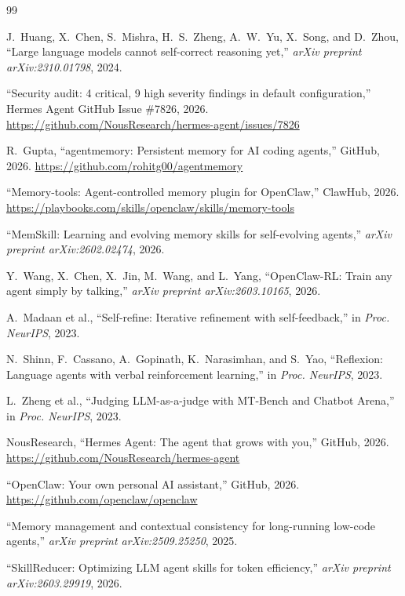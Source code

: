 \documentclass[12pt,a4paper]{article}
\begin{document}
	
	\begin{thebibliography}{99}
		
		J.~Huang, X.~Chen, S.~Mishra, H.~S.~Zheng, A.~W.~Yu, X.~Song, and D.~Zhou,
		``Large language models cannot self-correct reasoning yet,''
		\textit{arXiv preprint arXiv:2310.01798}, 2024.
		
		``Security audit: 4 critical, 9 high severity findings in default configuration,''
		Hermes Agent GitHub Issue \#7826, 2026.
		\url{https://github.com/NousResearch/hermes-agent/issues/7826}
		
		R.~Gupta,
		``agentmemory: Persistent memory for AI coding agents,''
		GitHub, 2026.
		\url{https://github.com/rohitg00/agentmemory}
		
		``Memory-tools: Agent-controlled memory plugin for OpenClaw,''
		ClawHub, 2026.
		\url{https://playbooks.com/skills/openclaw/skills/memory-tools}
		
		``MemSkill: Learning and evolving memory skills for self-evolving agents,''
		\textit{arXiv preprint arXiv:2602.02474}, 2026.
		
		Y.~Wang, X.~Chen, X.~Jin, M.~Wang, and L.~Yang,
		``OpenClaw-RL: Train any agent simply by talking,''
		\textit{arXiv preprint arXiv:2603.10165}, 2026.
		
		A.~Madaan et al.,
		``Self-refine: Iterative refinement with self-feedback,''
		in \textit{Proc. NeurIPS}, 2023.
		
		N.~Shinn, F.~Cassano, A.~Gopinath, K.~Narasimhan, and S.~Yao,
		``Reflexion: Language agents with verbal reinforcement learning,''
		in \textit{Proc. NeurIPS}, 2023.
		
		L.~Zheng et al.,
		``Judging LLM-as-a-judge with MT-Bench and Chatbot Arena,''
		in \textit{Proc. NeurIPS}, 2023.
		
		NousResearch,
		``Hermes Agent: The agent that grows with you,''
		GitHub, 2026.
		\url{https://github.com/NousResearch/hermes-agent}
		
		``OpenClaw: Your own personal AI assistant,''
		GitHub, 2026.
		\url{https://github.com/openclaw/openclaw}
		
		``Memory management and contextual consistency for long-running low-code agents,''
		\textit{arXiv preprint arXiv:2509.25250}, 2025.
		
		``SkillReducer: Optimizing LLM agent skills for token efficiency,''
		\textit{arXiv preprint arXiv:2603.29919}, 2026.
		
	\end{thebibliography}
	
\end{document}
